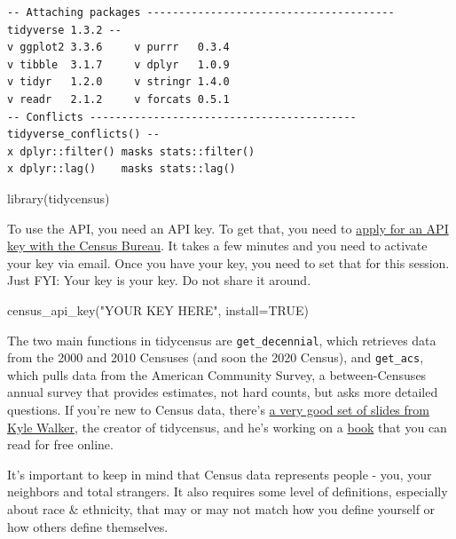 \documentclass[
  letterpaper,
  DIV=11,
  numbers=noendperiod]{scrreprt}
\newenvironment{Shaded}{\begin{snugshade}}{\end{snugshade}}
\newcommand{\AttributeTok}[1]{\textcolor[rgb]{0.40,0.45,0.13}{#1}}
\newcommand{\ConstantTok}[1]{\textcolor[rgb]{0.56,0.35,0.01}{#1}}
\newcommand{\FunctionTok}[1]{\textcolor[rgb]{0.28,0.35,0.67}{#1}}
\newcommand{\NormalTok}[1]{\textcolor[rgb]{0.00,0.23,0.31}{#1}}
\newcommand{\StringTok}[1]{\textcolor[rgb]{0.13,0.47,0.30}{#1}}
\begin{document}
\begin{verbatim}
-- Attaching packages --------------------------------------- tidyverse 1.3.2 --
v ggplot2 3.3.6     v purrr   0.3.4
v tibble  3.1.7     v dplyr   1.0.9
v tidyr   1.2.0     v stringr 1.4.0
v readr   2.1.2     v forcats 0.5.1
-- Conflicts ------------------------------------------ tidyverse_conflicts() --
x dplyr::filter() masks stats::filter()
x dplyr::lag()    masks stats::lag()
\end{verbatim}

\begin{Shaded}
\begin{Highlighting}[]
\FunctionTok{library}\NormalTok{(tidycensus)}
\end{Highlighting}
\end{Shaded}

To use the API, you need an API key. To get that, you need to
\href{https://api.census.gov/data/key_signup.html}{apply for an API key
with the Census Bureau}. It takes a few minutes and you need to activate
your key via email. Once you have your key, you need to set that for
this session. Just FYI: Your key is your key. Do not share it around.

\begin{Shaded}
\begin{Highlighting}[]
\FunctionTok{census\_api\_key}\NormalTok{(}\StringTok{"YOUR KEY HERE"}\NormalTok{, }\AttributeTok{install=}\ConstantTok{TRUE}\NormalTok{)}
\end{Highlighting}
\end{Shaded}

The two main functions in tidycensus are \texttt{get\_decennial}, which
retrieves data from the 2000 and 2010 Censuses (and soon the 2020
Census), and \texttt{get\_acs}, which pulls data from the American
Community Survey, a between-Censuses annual survey that provides
estimates, not hard counts, but asks more detailed questions. If you're
new to Census data, there's
\href{http://walker-data.com/umich-workshop/census-data-in-r/slides/\#1}{a
very good set of slides from Kyle Walker}, the creator of tidycensus,
and he's working on a
\href{https://walker-data.com/census-r/index.html}{book} that you can
read for free online.

It's important to keep in mind that Census data represents people - you,
your neighbors and total strangers. It also requires some level of
definitions, especially about race \& ethnicity, that may or may not
match how you define yourself or how others define themselves.
\end{document}
